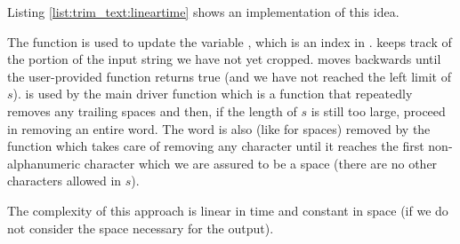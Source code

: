 Listing \ref{list:trim_text:lineartime} shows an implementation of this idea.



The function  is used to update the variable , which is an index in .  keeps track of the portion of the input string we have not yet cropped.  
 moves  backwards until the user-provided function  returns true (and we have not reached the left limit of $s$).
 is used by the main driver function  which is a function that repeatedly removes any trailing spaces and then, if the length of $s$ is still too large, proceed in removing an entire word. 
The word is also (like for spaces) removed by the function  which takes care of removing any character until it reaches the first non-alphanumeric character which we are assured to be a space (there are no other characters allowed in $s$).

The complexity of this approach is linear in time and constant in space (if we do not consider the space necessary for the output).



